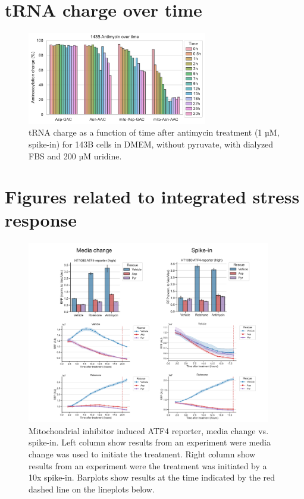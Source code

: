 \section{tRNA charge over time}
\begin{figure}[ht]
    \centering
    \includegraphics[width=0.7\textwidth]{figures/chap2/app/143B_Anti-time_Asp-Asn.pdf}
    \caption[Antimycin time-series in 143B, effect on tRNA charge.]{
        tRNA charge as a function of time after antimycin treatment (1 µM, spike-in) for 143B cells in DMEM, without pyruvate, with dialyzed FBS and 200 µM uridine.
    }
    \label{fig:app_ch2:143B_Anti_time}
\end{figure}




\section{Figures related to integrated stress response}
\label{sec:ch2:app:ISR}
\begin{figure}[ht]
    \centering
    \includegraphics[width=0.95\textwidth]{figures/chap2/app/atf4_chVSsp.pdf}
    \caption[ATF4 reporter, media change vs. spike-in.]{
    Mitochondrial inhibitor induced ATF4 reporter, media change vs. spike-in.
    Left column show results from an experiment were media change was used to initiate the treatment.
    Right column show results from an experiment were the treatment was initiated by a 10x spike-in.
    Barplots show results at the time indicated by the red dashed line on the lineplots below.
    }
    \label{fig:app_ch2:atf4_chVSsp}
\end{figure}

